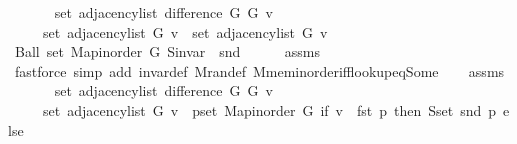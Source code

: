 \begin{isabellebody}
\ \ \isanewline
\ \ \ \ {\isachardoublequoteopen}set\ {\isacharparenleft}{\kern0pt}adjacency{\isacharunderscore}{\kern0pt}list\ {\isacharparenleft}{\kern0pt}difference\ G{}\ G{}{\isacharparenright}{\kern0pt}\ v{\isacharparenright}{\kern0pt}\ {\isacharequal}{\kern0pt}\isanewline
\ \ \ \ \ set\ {\isacharparenleft}{\kern0pt}adjacency{\isacharunderscore}{\kern0pt}list\ G{}\ v{\isacharparenright}{\kern0pt}\ {\isacharminus}{\kern0pt}\ set\ {\isacharparenleft}{\kern0pt}adjacency{\isacharunderscore}{\kern0pt}list\ G{}\ v{\isacharparenright}{\kern0pt}{\isachardoublequoteclose}\isanewline
%
\isadelimproof
%
\endisadelimproof
%
\isatagproof
{}\isamarkupfalse%
\ {\isacharminus}{\kern0pt}\isanewline
\ \ \isamarkupfalse%
\ {\isachardoublequoteopen}Ball\ {\isacharparenleft}{\kern0pt}set\ {\isacharparenleft}{\kern0pt}Map{\isacharunderscore}{\kern0pt}inorder\ G{}{\isacharparenright}{\kern0pt}{\isacharparenright}{\kern0pt}\ {\isacharparenleft}{\kern0pt}S{\isachardot}{\kern0pt}invar\ {\isasymcirc}\ snd{\isacharparenright}{\kern0pt}{\isachardoublequoteclose}\isanewline
\ \ \ \ \isamarkupfalse%
\ assms{\isacharparenleft}{\kern0pt}{}{\isacharparenright}{\kern0pt}\isanewline
\ \ \ \ \isamarkupfalse%
\ {\isacharparenleft}{\kern0pt}fastforce\ simp\ add{\isacharcolon}{\kern0pt}\ invar{\isacharunderscore}{\kern0pt}def\ M{\isachardot}{\kern0pt}ran{\isacharunderscore}{\kern0pt}def\ M{\isachardot}{\kern0pt}mem{\isacharunderscore}{\kern0pt}inorder{\isacharunderscore}{\kern0pt}iff{\isacharunderscore}{\kern0pt}lookup{\isacharunderscore}{\kern0pt}eq{\isacharunderscore}{\kern0pt}Some{\isacharparenright}{\kern0pt}\isanewline
\ \ \isamarkupfalse%
\ assms{\isacharparenleft}{\kern0pt}{}{\isacharparenright}{\kern0pt}\isanewline
\ \ \isamarkupfalse%
\isanewline
\ \ \ \ {\isachardoublequoteopen}set\ {\isacharparenleft}{\kern0pt}adjacency{\isacharunderscore}{\kern0pt}list\ {\isacharparenleft}{\kern0pt}difference\ G{}\ G{}{\isacharparenright}{\kern0pt}\ v{\isacharparenright}{\kern0pt}\ {\isacharequal}{\kern0pt}\isanewline
\ \ \ \ \ set\ {\isacharparenleft}{\kern0pt}adjacency{\isacharunderscore}{\kern0pt}list\ G{}\ v{\isacharparenright}{\kern0pt}\ {\isacharminus}{\kern0pt}\ {\isacharparenleft}{\kern0pt}{\isasymUnion}p{\isasymin}set\ {\isacharparenleft}{\kern0pt}Map{\isacharunderscore}{\kern0pt}inorder\ G{}{\isacharparenright}{\kern0pt}{\isachardot}{\kern0pt}\ if\ v\ {\isacharequal}{\kern0pt}\ fst\ p\ then\ S{\isachardot}{\kern0pt}set\ {\isacharparenleft}{\kern0pt}snd\ p{\isacharparenright}{\kern0pt}\ else\ {\isacharbraceleft}{\kern0pt}{\isacharbraceright}{\kern0pt}{\isacharparenright}{\kern0pt}{\isachardoublequoteclose}\isanewline

\end{isabellebody}
